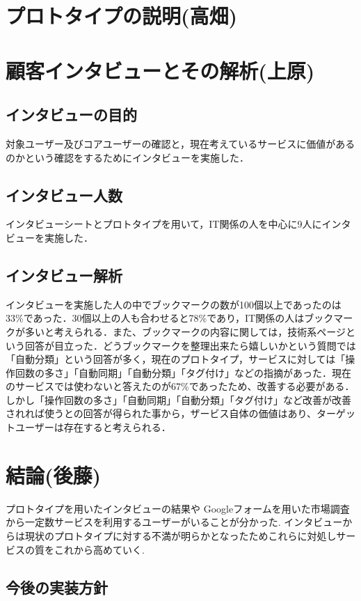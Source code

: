 \documentclass[a4paper,10pt,fleqn]{jsarticle}
\begin{document}
\section{プロトタイプの説明(高畑)}

\section{顧客インタビューとその解析(上原)}

\subsection{インタビューの目的}
対象ユーザー及びコアユーザーの確認と，現在考えているサービスに価値があるのかという確認をするためにインタビューを実施した．

\subsection{インタビュー人数}
インタビューシートとプロトタイプを用いて，IT関係の人を中心に9人にインタビューを実施した．

\subsection{インタビュー解析}
インタビューを実施した人の中でブックマークの数が100個以上であったのは33\%であった．30個以上の人も合わせると78\%であり，IT関係の人はブックマークが多いと考えられる．また、ブックマークの内容に関しては，技術系ページという回答が目立った．どうブックマークを整理出来たら嬉しいかという質問では「自動分類」という回答が多く，現在のプロトタイプ，サービスに対しては「操作回数の多さ」「自動同期」「自動分類」「タグ付け」などの指摘があった．現在のサービスでは使わないと答えたのが67\%であったため、改善する必要がある．しかし「操作回数の多さ」「自動同期」「自動分類」「タグ付け」など改善が改善されれば使うとの回答が得られた事から，ザービス自体の価値はあり、ターゲットユーザーは存在すると考えられる．

\section{結論(後藤)}
プロトタイプを用いたインタビューの結果や
Googleフォームを用いた市場調査から一定数サービスを利用するユーザーがいることが分かった.
インタビューからは現状のプロトタイプに対する不満が明らかとなったためこれらに対処しサービスの質をこれから高めていく.

\subsection{今後の実装方針}
\end{document}
